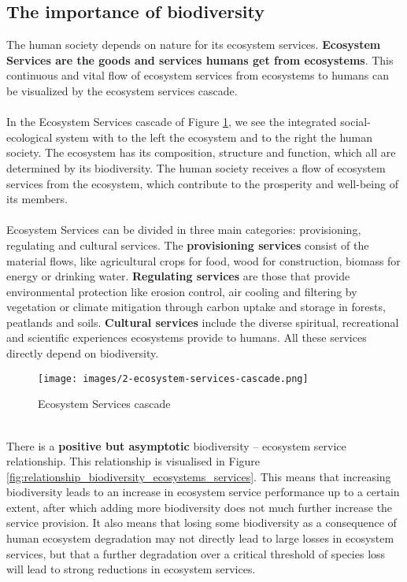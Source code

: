 \documentclass[../summary.tex]{subfiles}
\begin{document}
	\subsection{The importance of biodiversity}
	The human society depends on nature for its ecosystem services. \textbf{Ecosystem Services are the goods and services humans get from ecosystems}. This continuous and vital flow of ecosystem services from ecosystems to humans can be visualized by the ecosystem services cascade.
	\\\\
	In the Ecosystem Services cascade of Figure \ref{fig:ecosystems_services_cascade}, we see the integrated social-ecological system with to the left the ecosystem and to the right the human society. The ecosystem has its composition, structure and function, which all are determined by its biodiversity. The human society receives a flow of ecosystem services from the ecosystem, which contribute to the prosperity and well-being of its members.
	\\\\
	Ecosystem Services can be divided in three main categories: provisioning, regulating and cultural services. The \textbf{provisioning services} consist of the material flows, like agricultural crops for food, wood for construction, biomass for energy or drinking water. \textbf{Regulating services} are those that provide environmental protection like erosion control, air cooling and filtering by vegetation or climate mitigation through carbon uptake and storage in forests, peatlands and soils. \textbf{Cultural services} include the diverse spiritual, recreational and scientific experiences ecosystems provide to humans. All these services directly depend on biodiversity.
	
	\begin{figure}[htbp]
		\centering
		\texttt{[image: images/2-ecosystem-services-cascade.png]}
		\caption{Ecosystem Services cascade}
		\label{fig:ecosystems_services_cascade}
	\end{figure}
	
	\newpage
	\ \\
	There is a \textbf{positive but asymptotic} biodiversity – ecosystem service relationship. This relationship is visualised in Figure \ref{fig:relationship_biodiversity_ecosystems_services}. This means that increasing biodiversity leads to an increase in ecosystem service performance up to a certain extent, after which adding more biodiversity does not much further increase the service provision. It also means that losing some biodiversity as a consequence of human ecosystem degradation may not directly lead to large losses in ecosystem services, but that a further degradation over a critical threshold of species loss will lead to strong reductions in ecosystem services.
	
\end{document}
